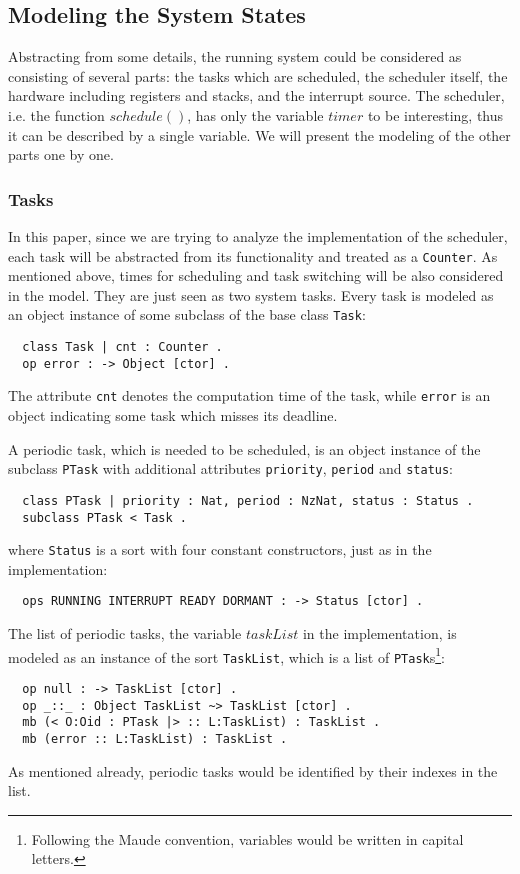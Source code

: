 \documentclass{llncs}
\begin{document}
\subsection{Modeling the System States}
Abstracting from some details, the running system could be considered
as consisting of several parts: the tasks which are scheduled, the
scheduler itself, the hardware including registers and stacks, and the
interrupt source. The scheduler, i.e. the function $schedule()$, has
only the variable $timer$ to be interesting, thus it can be described
by a single variable. We will present the modeling of the other parts
one by one.

\subsubsection{Tasks}
In this paper, since we are trying to analyze the implementation of
the scheduler, each task will be abstracted from its functionality and
treated as a \verb|Counter|. As mentioned above, times for scheduling
and task switching will be also considered in the model. They are just
seen as two system tasks. Every task is modeled as an object instance
of some subclass of the base class \verb|Task|:
\begin{verbatim}
  class Task | cnt : Counter .
  op error : -> Object [ctor] .
\end{verbatim}
The attribute \verb|cnt| denotes the computation time of the task,
while \verb|error| is an object indicating some task which misses its
deadline.

A periodic task, which is needed to be scheduled, is an object
instance of the subclass \verb|PTask| with additional attributes
\verb|priority|, \verb|period| and \verb|status|:
\begin{verbatim}
  class PTask | priority : Nat, period : NzNat, status : Status .
  subclass PTask < Task .
\end{verbatim}
where \verb|Status| is a sort with four constant constructors, just as
in the implementation:
\begin{verbatim}
  ops RUNNING INTERRUPT READY DORMANT : -> Status [ctor] .
\end{verbatim}
The list of periodic tasks, the variable $taskList$ in the
implementation, is modeled as an instance of the sort \verb|TaskList|,
which is a list of \verb|PTask|s\footnote{Following the Maude
  convention, variables would be written in capital letters.}:
\begin{verbatim}
  op null : -> TaskList [ctor] .
  op _::_ : Object TaskList ~> TaskList [ctor] .
  mb (< O:Oid : PTask |> :: L:TaskList) : TaskList .
  mb (error :: L:TaskList) : TaskList .
\end{verbatim}
As mentioned already, periodic tasks would be identified by their
indexes in the list.
\end{document}
